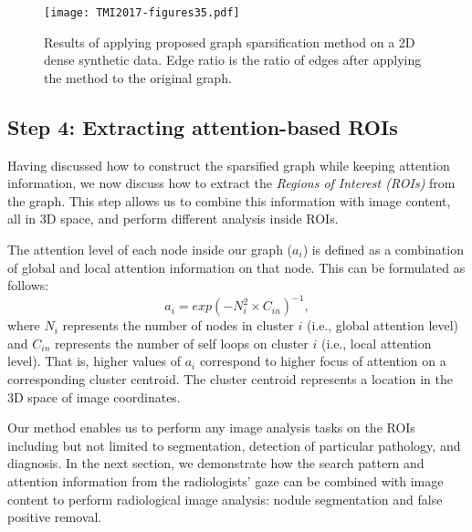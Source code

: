 \documentclass[preprint,12pt]{elsarticle}
\begin{document}
\begin{figure}[h]
\centering
\texttt{[image: TMI2017-figures35.pdf]}
\caption{Results of applying proposed graph sparsification method on a 2D dense synthetic data. Edge ratio is the ratio of edges after applying the method to the original graph. \label{fig:2Dtoy}}
\end{figure}


\subsection{Step 4: Extracting attention-based ROIs}
Having discussed how to construct the sparsified graph while keeping attention information, we now discuss how to extract the \textit{Regions of Interest (ROIs)} from the graph. This step allows us to combine this information with image content, all in 3D space, and perform different analysis inside ROIs.

The attention level of each node inside our graph ($a_{i}$) is defined as a combination of global and local attention information on that node. This can be formulated as follows:
\begin{equation}
a_{i}=exp({-N_{i}^{2}\times C_{in}})^{-1},
\end{equation}
\noindent where $N_{i}$ represents the number of nodes in cluster $i$ (i.e., global attention level) and $C_{in}$ represents the number of self loops on cluster $i$ (i.e., local attention level). That is, higher values of $a_{i}$ correspond to higher focus of attention on a corresponding cluster centroid. The cluster centroid represents a location in the 3D space of image coordinates. 

Our method enables us to perform any image analysis tasks on the ROIs including but not limited to segmentation, detection of particular pathology, and diagnosis. In the next section, we demonstrate how the search pattern and attention information from the radiologists' gaze can be combined with image content to perform radiological image analysis: nodule segmentation and false positive removal. 
\end{document}
